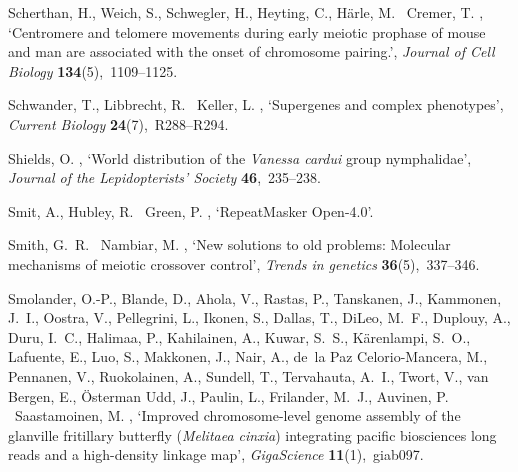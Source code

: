 \documentclass[twocolumn]{bmcart}%
\begin{document}
\begin{backmatter}
\begin{thebibliography}{xx}
Scherthan, H., Weich, S., Schwegler, H., Heyting, C., Härle, M. \harvardand\
  Cremer, T.  \harvardyearright , `Centromere and telomere
  movements during early meiotic prophase of mouse and man are associated with
  the onset of chromosome pairing.', {\em Journal of Cell Biology} {\bf
  134}(5),~1109--1125.

Schwander, T., Libbrecht, R. \harvardand\ Keller, L.  \harvardyearleft
  2014\harvardyearright , `Supergenes and complex phenotypes', {\em Current
  Biology} {\bf 24}(7),~R288--R294.

Shields, O.  \harvardyearright , `World distribution of
  the \textit{Vanessa cardui} group nymphalidae', {\em Journal of the
  {{Lepidopterists}}' {{Society}}} {\bf 46},~235--238.

Smit, A., Hubley, R. \harvardand\ Green, P.  \harvardyearleft
  2015\harvardyearright , `{{RepeatMasker Open-4}}.0'.
\newline{}

Smith, G.~R. \harvardand\ Nambiar, M.  \harvardyearright ,
  `New solutions to old problems: Molecular mechanisms of meiotic crossover
  control', {\em Trends in genetics} {\bf 36}(5),~337--346.

Smolander, O.-P., Blande, D., Ahola, V., Rastas, P., Tanskanen, J., Kammonen,
  J.~I., Oostra, V., Pellegrini, L., Ikonen, S., Dallas, T., DiLeo, M.~F.,
  Duplouy, A., Duru, I.~C., Halimaa, P., Kahilainen, A., Kuwar, S.~S.,
  Kärenlampi, S.~O., Lafuente, E., Luo, S., Makkonen, J., Nair, A., de~la Paz
  Celorio-Mancera, M., Pennanen, V., Ruokolainen, A., Sundell, T., Tervahauta,
  A.~I., Twort, V., van Bergen, E., Österman Udd, J., Paulin, L., Frilander,
  M.~J., Auvinen, P. \harvardand\ Saastamoinen, M.  \harvardyearleft
  2022\harvardyearright , `Improved chromosome-level genome assembly of the
  glanville fritillary butterfly (\textit{Melitaea cinxia}) integrating pacific
  biosciences long reads and a high-density linkage map', {\em GigaScience}
  {\bf 11}(1),~giab097.


\end{thebibliography}
\end{backmatter}
\end{document}
